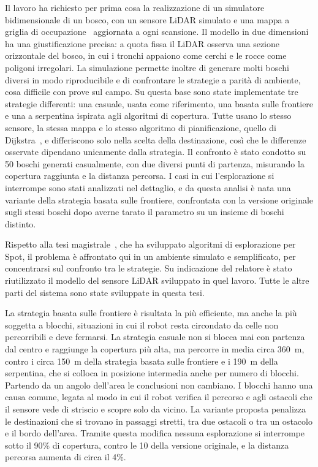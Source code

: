 Il lavoro ha richiesto per prima cosa la realizzazione di un simulatore bidimensionale di un bosco, con un sensore LiDAR simulato e una mappa a griglia di occupazione~\cite{elfes1989} aggiornata a ogni scansione. Il modello in due dimensioni ha una giustificazione precisa: a quota fissa il LiDAR osserva una sezione orizzontale del bosco, in cui i tronchi appaiono come cerchi e le rocce come poligoni irregolari. La simulazione permette inoltre di generare molti boschi diversi in modo riproducibile e di confrontare le strategie a parità di ambiente, cosa difficile con prove sul campo. Su questa base sono state implementate tre strategie differenti: una casuale, usata come riferimento, una basata sulle frontiere e una a serpentina ispirata agli algoritmi di copertura. Tutte usano lo stesso sensore, la stessa mappa e lo stesso algoritmo di pianificazione, quello di Dijkstra~\cite{dijkstra1959}, e differiscono solo nella scelta della destinazione, così che le differenze osservate dipendano unicamente dalla strategia. Il confronto è stato condotto su 50 boschi generati casualmente, con due diversi punti di partenza, misurando la copertura raggiunta e la distanza percorsa. I casi in cui l'esplorazione si interrompe sono stati analizzati nel dettaglio, e da questa analisi è nata una variante della strategia basata sulle frontiere, confrontata con la versione originale sugli stessi boschi dopo averne tarato il parametro su un insieme di boschi distinto.

Rispetto alla tesi magistrale~\cite{gennai2026}, che ha sviluppato algoritmi di esplorazione per Spot, il problema è affrontato qui in un ambiente simulato e semplificato, per concentrarsi sul confronto tra le strategie. Su indicazione del relatore è stato riutilizzato il modello del sensore LiDAR sviluppato in quel lavoro. Tutte le altre parti del sistema sono state sviluppate in questa tesi.

La strategia basata sulle frontiere è risultata la più efficiente, ma anche la più soggetta a blocchi, situazioni in cui il robot resta circondato da celle non percorribili e deve fermarsi. La strategia casuale non si blocca mai con partenza dal centro e raggiunge la copertura più alta, ma percorre in media circa 360~m, contro i circa 150~m della strategia basata sulle frontiere e i 190~m della serpentina, che si colloca in posizione intermedia anche per numero di blocchi. Partendo da un angolo dell'area le conclusioni non cambiano. I blocchi hanno una causa comune, legata al modo in cui il robot verifica il percorso e agli ostacoli che il sensore vede di striscio e scopre solo da vicino. La variante proposta penalizza le destinazioni che si trovano in passaggi stretti, tra due ostacoli o tra un ostacolo e il bordo dell'area. Tramite questa modifica nessuna esplorazione si interrompe sotto il 90\% di copertura, contro le 10 della versione originale, e la distanza percorsa aumenta di circa il 4\%.

